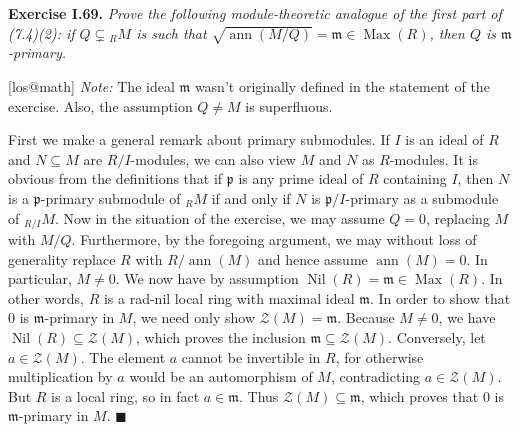 \documentclass{article}
\makeatletter
\newcommand\<{\triangleleft}
\DeclareMathOperator{\ann}{ann}
\newcommand{\m}{\ensuremath{\mathfrak{m}}}
\DeclareMathOperator{\Max}{Max}
\DeclareMathOperator{\nil}{Nil}
\newcommand\p{\mathfrak{p}}
\newcommand\Z{\mathcal{Z}}
\newenvironment{exercise}[1]{\gdef\currentEx{#1}\begin{trivlist}\item[]%
                \textbf{Exercise #1.} \it}{\end{trivlist}}
\newenvironment{solution}[1]{\def\x{#1}\begin{trivlist}\item[]\hspace*{-.5em}[\x]}
                {\hspace*{\fill} $\blacksquare$
                \protected@write0{}{\currentEx, \x}
                \end{trivlist}}
\makeatother
\begin{document}
 \begin{exercise}{I.69}
   Prove the following module-theoretic analogue of the first part of (7.4)(2): if $Q \subsetneq
   {}_RM$ is such that $\sqrt{\ann(M/Q)} = \m \in \Max(R)$, then $Q$ is $\m$-primary.
 \end{exercise}
 \begin{solution}{los@math}
   {\it Note:} The ideal $\m$ wasn't originally defined in the statement of the exercise. Also, the
   assumption $Q \neq M$ is superfluous.

   \noindent
   First we make a general remark about primary submodules. If
   $I$ is an ideal of $R$ and $N \subseteq M$ are $R/I$-modules,
   we can also view $M$ and $N$ as $R$-modules. It is obvious from the
   definitions that if $\p$ is any prime ideal of $R$ containing $I$,
   then $N$ is a $\p$-primary submodule of ${}_RM$ if and only if $N$
   is $\p/I$-primary as a submodule of ${}_{R/I}M$. Now in the situation
   of the exercise, we may assume $Q=0$, replacing $M$ with $M/Q$.
   Furthermore, by the foregoing argument, we may without loss of
   generality replace $R$ with $R/{\ann(M)}$ and hence assume $\ann(M)=0$.
   In particular, $M \neq 0$.
   We now have by assumption $\nil(R)=\m \in \Max(R)$. In other words,
   $R$ is a rad-nil local ring with maximal ideal $\m$. In order to
   show that $0$ is $\m$-primary in $M$, we need only show $\Z(M)=\m$.
   Because $M \neq 0$, we have $\nil(R) \subseteq \Z(M)$, which proves the
   inclusion $\m \subseteq \Z(M)$. Conversely, let $a \in \Z(M)$. The element
   $a$ cannot be invertible in $R$, for otherwise multiplication by $a$ would be an
   automorphism of $M$, contradicting $a \in \Z(M)$. But $R$ is a local ring, so in fact
   $a \in \m$. Thus $\Z(M) \subseteq \m$, which proves that $0$ is $\m$-primary in $M$.
 \end{solution}
\end{document}
